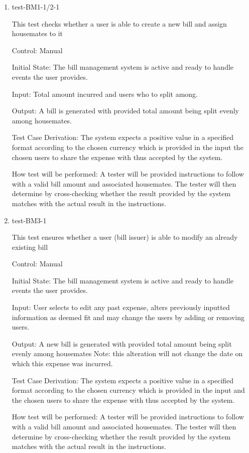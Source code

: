 \documentclass[12pt, titlepage]{article}
\begin{document}
\begin{enumerate}

\item{test-BM1-1/2-1\\}

This test checks whether a user is able to create a new bill and assign housemates to it

Control: Manual
					
Initial State: The bill management system is active and ready to handle events the user provides.
					
Input: Total amount incurred and users who to split among.
					
Output: A bill is generated with provided total amount being split evenly among housemates.

Test Case Derivation: The system expects a positive value in a specified format according to the chosen currency which is provided in the input the chosen users to share the expense with thus accepted by the system.
					
How test will be performed: A tester will be provided instructions to follow with a valid bill amount and associated housemates. The tester will then determine by cross-checking whether the result provided by the system matches with the actual result in the instructions.
					
\item{test-BM3-1\\}

This test ensures whether a user (bill issuer) is able to modify an already existing bill

Control: Manual
					
Initial State: The bill management system is active and ready to handle events the user provides.
					
Input: User selects to edit any past expense, alters previously inputted information as deemed fit and may change the users by adding or removing users. 
					
Output: A new bill is generated with provided total amount being split evenly among housemates Note: this alteration will not change the date on which this expense was incurred.

Test Case Derivation: The system expects a positive value in a specified format according to the chosen currency which is provided in the input and the chosen users to share the expense with thus accepted by the system.

How test will be performed: A tester will be provided instructions to follow with a valid bill amount and associated housemates. The tester will then determine by cross-checking whether the result provided by the system matches with the actual result in the instructions. 


\end{enumerate}
\end{document}
